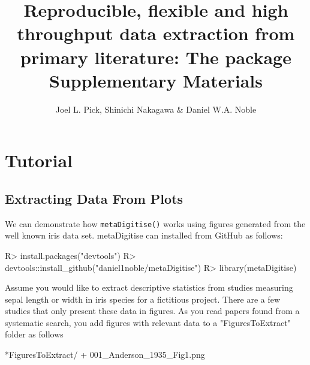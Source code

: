 \documentclass[12pt]{article}
\title{Reproducible, flexible and high throughput data extraction from primary literature: The \pkg{metaDigitise} \proglang{R} package \vskip15pt Supplementary Materials}
\author{Joel L. Pick, Shinichi Nakagawa \& Daniel W.A. Noble}
\newcommand{\fct}[1]{\texttt{#1()}}
\newcommand{\pkg}[1]{{\fontseries{b}\selectfont #1}}
\begin{document}
\newenvironment{CodeChunk}{}{}

\setcounter{equation}{0}
\setcounter{subsection}{0}

\renewcommand{\thetable}{S\arabic{table}}%
\renewcommand{\thefigure}{S\arabic{figure}}%
\renewcommand{\theequation}{S\arabic{equation}}%
\renewcommand{\thesection}{S\arabic{section}}%
\renewcommand{\thesubsection}{S\arabic{section}.\arabic{subsection}}%



\maketitle

\clearpage

\tableofcontents

\clearpage

\section{Tutorial}
\subsection{Extracting Data From Plots}


We can demonstrate how \fct{metaDigitise} works using figures generated from the well known iris data set. \pkg{metaDigitise} can installed from GitHub as follows:

\begin{CodeChunk}
\begin{CodeInput}
R> install.packages("devtools")
R> devtools::install_github("daniel1noble/metaDigitise")
R> library(metaDigitise)
\end{CodeInput}
\end{CodeChunk}

Assume you would like to extract descriptive statistics from studies measuring sepal length or width in iris species for a fictitious project. There are a few studies that only present these data in figures. As you read papers found from a systematic search, you add figures with relevant data to a "FiguresToExtract" folder as follows

\begin{CodeChunk}
\begin{CodeOutput}
*FiguresToExtract/
    + 001_Anderson_1935_Fig1.png
\end{CodeOutput}
\end{CodeChunk}
\end{document}
